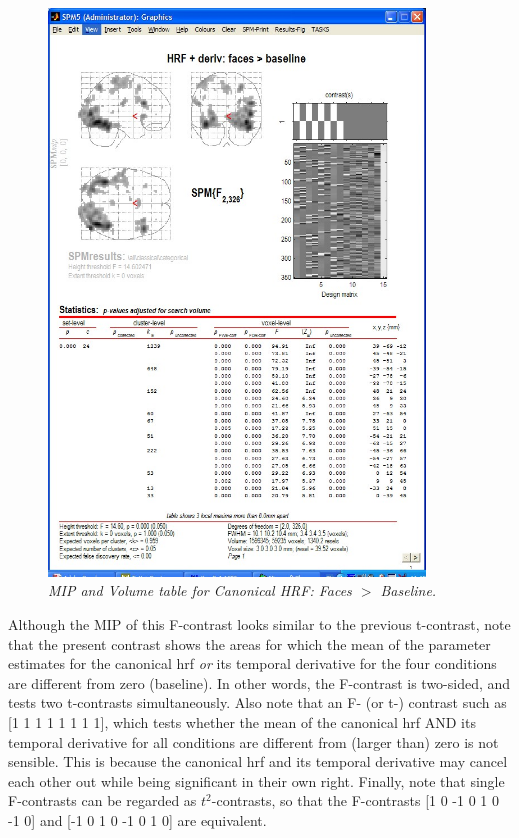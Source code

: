 \begin{figure}
\begin{center}
\includegraphics[width=100mm]{faces/cat1_volume}
\caption{\em MIP and Volume table for Canonical HRF: Faces  $>$ Baseline. \label{cat1_volume} }
\end{center}
\end{figure}

Although the MIP of this F-contrast looks similar to the previous t-contrast, note that the present contrast shows the areas for which the mean of the parameter estimates for the canonical hrf {\em or} its temporal derivative for the four conditions are different from zero (baseline). In other words, the F-contrast is two-sided, and tests two t-contrasts simultaneously. Also note that an F- (or t-) contrast such as [1 1 1 1 1 1 1 1], which tests whether the mean of the canonical hrf AND its temporal derivative for all conditions are different from (larger than) zero is not sensible. This is because the canonical hrf and its temporal derivative may cancel each other out while being significant in their own right. Finally, note that single F-contrasts can be regarded as $t^2$-contrasts, so that the F-contrasts [1 0 -1 0 1 0 -1 0] and [-1 0 1 0 -1 0 1 0] are equivalent. 

